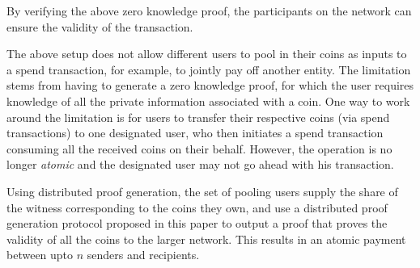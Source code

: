By verifying the above zero knowledge proof, the participants on the network can ensure the validity of the transaction.

 The above setup does not allow different users to pool in their coins as inputs to a spend transaction, for example,
to jointly pay off another entity. The limitation stems from having to generate a zero knowledge proof, for which the user requires knowledge of all the
private information associated with a coin. One way to work around the limitation is for users to transfer their respective coins (via spend transactions) 
to one designated user, who then initiates a spend transaction consuming all the received coins on their behalf. 
However, the operation is no longer {\em atomic} and the designated user may not go ahead with his transaction. 

Using distributed proof generation, the set of pooling users supply the share of the witness corresponding to the coins they own,
and use a distributed proof generation protocol proposed in this paper to output a proof that proves the validity of all the coins to the 
larger network. This results in an atomic payment between upto $n$ senders and recipients.


